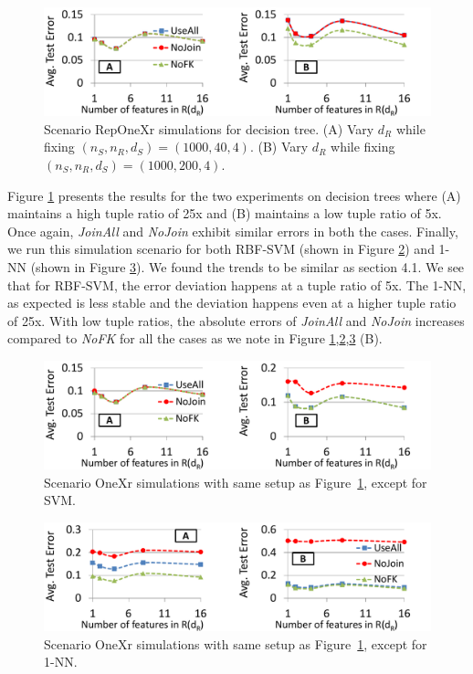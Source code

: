 \documentclass{vldb}
\begin{document}
\begin{figure}[h]
\centering
\includegraphics[width=0.99\linewidth]{onexr_jerrydt.pdf}
\caption{Scenario RepOneXr simulations for decision tree. (A) Vary $d_R$ while fixing $(n_S, n_R, d_S) = (1000, 40, 4)$. (B) Vary $d_R$ while fixing $(n_S, n_R, d_S) = (1000, 200, 4)$.}
\label{Figure:OneXrjerry_dt}
\end{figure}

Figure \ref{Figure:OneXrjerry_dt} presents the results for the two experiments on decision trees where (A) maintains a high tuple ratio of 25x and (B) maintains a low tuple ratio of 5x. Once again, \textit{JoinAll} and \textit{NoJoin} exhibit similar errors in both the cases. Finally, we run this simulation scenario for both RBF-SVM (shown in Figure \ref{Figure:OneXrjerry_svm}) and 1-NN (shown in Figure \ref{Figure:OneXrjerry_1nn}). We found the trends to be similar as section 4.1. We see that for RBF-SVM, the error deviation happens at a tuple ratio of 5x. The 1-NN, as expected is less stable and the deviation happens even at a higher tuple ratio of 25x. With low tuple ratios, the absolute errors of \textit{JoinAll} and \textit{NoJoin} increases compared to \textit{NoFK} for all the cases as we note in Figure \ref{Figure:OneXrjerry_dt},\ref{Figure:OneXrjerry_svm},\ref{Figure:OneXrjerry_1nn} (B).

\begin{figure}[h]
\centering
\includegraphics[width=0.99\linewidth]{onexr_jerrysvm.pdf}
\caption{Scenario OneXr simulations with same setup as Figure~\ref{Figure:OneXrjerry_dt}, except for SVM.}
\label{Figure:OneXrjerry_svm}
\end{figure}

\begin{figure}[h]
\centering
\includegraphics[width=0.99\linewidth]{onexr_jerry1nn.pdf}
\caption{Scenario OneXr simulations with same setup as Figure~\ref{Figure:OneXrjerry_dt}, except for 1-NN.}
\label{Figure:OneXrjerry_1nn}
\end{figure}
\end{document}

